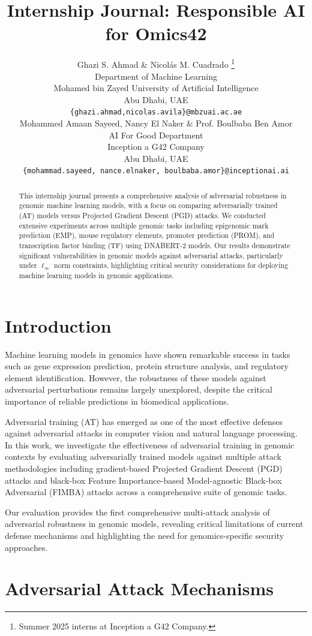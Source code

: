 \documentclass{article} %
\title{Internship Journal: Responsible AI for Omics42}
\author{Ghazi S. Ahmad \& Nicolás M. Cuadrado \thanks{Summer 2025 interns at Inception a G42 Company.} \\
    Department of Machine Learning\\
    Mohamed bin Zayed University of Artificial Intelligence\\
    Abu Dhabi, UAE \\
    \texttt{\{ghazi.ahmad,nicolas.avila\}@mbzuai.ac.ae} \\
    \AND
    Mohammed Amaan Sayeed, Nancy El Naker \& Prof. Boulbaba Ben Amor \\
    AI For Good Department\\
    Inception a G42 Company \\
    Abu Dhabi, UAE \\
    \texttt{\{mohammad.sayeed, nance.elnaker, boulbaba.amor\}@inceptionai.ai} \\
    }
\begin{document}
\maketitle

\begin{abstract}
This internship journal presents a comprehensive analysis of adversarial robustness in genomic machine learning models, with a focus on comparing adversarially trained (AT) models versus Projected Gradient Descent (PGD) attacks. We conducted extensive experiments across multiple genomic tasks including epigenomic mark prediction (EMP), mouse regulatory elements, promoter prediction (PROM), and transcription factor binding (TF) using DNABERT-2 models. Our results demonstrate significant vulnerabilities in genomic models against adversarial attacks, particularly under $\ell_\infty$ norm constraints, highlighting critical security considerations for deploying machine learning models in genomic applications.
\end{abstract}

\section{Introduction}

Machine learning models in genomics have shown remarkable success in tasks such as gene expression prediction, protein structure analysis, and regulatory element identification. However, the robustness of these models against adversarial perturbations remains largely unexplored, despite the critical importance of reliable predictions in biomedical applications.

Adversarial training (AT) has emerged as one of the most effective defenses against adversarial attacks in computer vision and natural language processing. In this work, we investigate the effectiveness of adversarial training in genomic contexts by evaluating adversarially trained models against multiple attack methodologies including gradient-based Projected Gradient Descent (PGD) attacks and black-box Feature Importance-based Model-agnostic Black-box Adversarial (FIMBA) attacks across a comprehensive suite of genomic tasks.

Our evaluation provides the first comprehensive multi-attack analysis of adversarial robustness in genomic models, revealing critical limitations of current defense mechanisms and highlighting the need for genomics-specific security approaches.

\section{Adversarial Attack Mechanisms}
\end{document}
